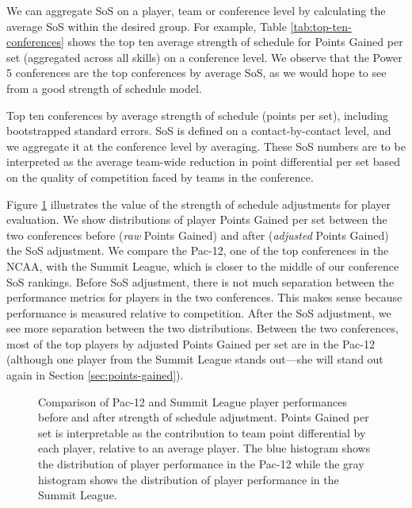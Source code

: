 \documentclass[USenglish]{article}
\theoremstyle{dgthm}
\theoremstyle{dgdef}
\begin{document}
We can aggregate SoS on a player, team or conference level by calculating the average SoS within the desired group. For example, Table \ref{tab:top-ten-conferences} shows the top ten average strength of schedule for Points Gained per set (aggregated across all skills) on a conference level. We observe that the Power 5 conferences are the top conferences by average SoS, as we would hope to see from a good strength of schedule model.

\begin{table}
    \centering
    
    \caption{Top ten conferences by average strength of schedule (points per set), including bootstrapped standard errors. SoS is defined on a contact-by-contact level, and we aggregate it at the conference level by averaging. These SoS numbers are to be interpreted as the average team-wide reduction in point differential per set based on the quality of competition faced by teams in the conference.}
    \label{tab:top-ten-conferences}
\end{table}

Figure \ref{fig:conference-comparison} illustrates the value of the strength of schedule adjustments for player evaluation. We show distributions of player Points Gained per set between the two conferences before ({\it raw} Points Gained) and after ({\it adjusted} Points Gained) the SoS adjustment. We compare the Pac-12, one of the top conferences in the NCAA, with the Summit League, which is closer to the middle of our conference SoS rankings. Before SoS adjustment, there is not much separation between the performance metrics for players in the two conferences. This makes sense because performance is measured relative to competition. After the SoS adjustment, we see more separation between the two distributions. Between the two conferences, most of the top players by adjusted Points Gained per set are in the Pac-12 (although one player from the Summit League stands out---she will stand out again in Section \ref{sec:points-gained}).

\begin{figure}
    \centering
    \caption{Comparison of Pac-12 and Summit League player performances before and after strength of schedule adjustment. Points Gained per set is interpretable as the contribution to team point differential by each player, relative to an average player. The blue histogram shows the distribution of player performance in the Pac-12 while the gray histogram shows the distribution of player performance in the Summit League.}
    \label{fig:conference-comparison}
\end{figure}
\end{document}
